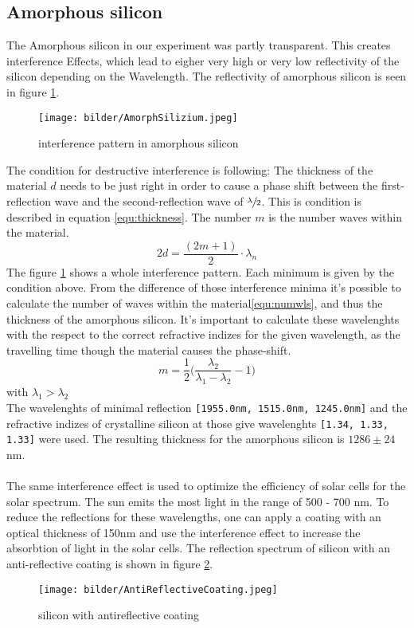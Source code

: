 \subsection{Amorphous silicon}
The Amorphous silicon in our experiment was partly transparent. This creates
interference Effects, which lead to eigher very high or very low reflectivity of
the silicon depending on the Wavelength. The reflectivity of amorphous silicon
is seen in figure \ref{fig:amorphsilizium}.
\begin{figure}[h]
  \centering
  \texttt{[image: bilder/AmorphSilizium.jpeg]}
  \caption{interference pattern in amorphous silicon}
  \label{fig:amorphsilizium}
\end{figure}
The condition for destructive interference is following: 
The thickness of the material $d$ needs to be just right in order to cause a phase shift
between the first-reflection wave and the second-reflection wave of $\sfrac{\lambda}{2}$.
This is condition is described in equation \ref{equ:thickness}. The number $m$ is the number
waves within the material.
\begin{equation}
  2d = \frac{(2m + 1)}{2} \cdot \lambda_n
  \label{equ:thickness}
\end{equation}
The figure \ref{fig:amorphsilizium} shows a whole interference pattern. Each minimum is
given by the condition above. From the difference of those interference minima it's
possible to calculate the number of waves within the material\ref{equ:numwls}, and thus the thickness of the
amorphous silicon.
It's important to calculate these wavelenghts with the respect to the correct refractive indizes for
the given wavelength, as the travelling time though the material causes the phase-shift.
\begin{equation}
  m = \frac{1}{2} \big( \frac{\lambda_2}{\lambda_1 - \lambda_2} - 1 \big)
  \label{equ:numwls}
\end{equation}
with $\lambda_1 > \lambda_2$ \\
The wavelenghts of minimal reflection \texttt{[1955.0nm, 1515.0nm, 1245.0nm]} and the refractive indizes of
crystalline silicon at those give wavelenghts \texttt{[1.34, 1.33, 1.33]} were used.
The resulting thickness for the amorphous silicon is $1286 \pm 24$ nm.\\
\\
The same interference effect is  used to optimize the efficiency of solar cells for
the solar spectrum. The sun emits the most light in the range of 500 - 700 nm.
To reduce the reflections for these wavelengths, one can apply a coating with an optical thickness
of 150nm and use the interference effect to increase the absorbtion of light in the solar cells.
The reflection spectrum of silicon with an anti-reflective coating is shown in figure \ref{fig:antireflectivecoating}.
\begin{figure}[h]
  \centering
  \texttt{[image: bilder/AntiReflectiveCoating.jpeg]}
  \caption{silicon with antireflective coating}
  \label{fig:antireflectivecoating}
\end{figure}

